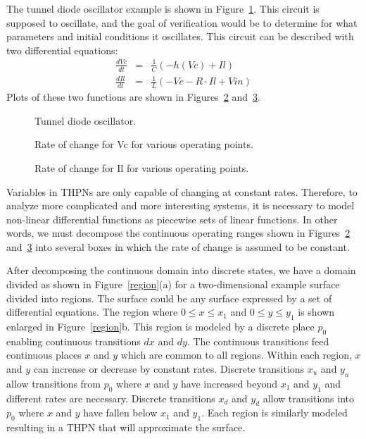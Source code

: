\documentclass[11pt,times]{article}
\begin{document}
The tunnel diode oscillator example is shown in Figure~\ref{tunnel}.
This circuit is supposed to oscillate, and the goal of verification would
be to determine for what parameters and initial conditions it oscillates.
This circuit can be described with two differential equations:
\begin{eqnarray*}
\frac{dVc}{dt} & = & \frac{1}{C}(-h(Vc) + Il) \\
\frac{dIl}{dt} & = & \frac{1}{L}(-Vc - R \cdot Il + Vin)
\end{eqnarray*}
Plots of these two functions are shown in Figures~\ref{dVc} and~\ref{dIl}.  

\begin{figure}[htbp]
\begin{center}
{\caption{\label{tunnel}Tunnel diode oscillator.}}
\end{center}
\end{figure}

\begin{figure}[htbp]
\begin{center}
{\caption{\label{dVc}Rate of change for Vc for various operating points.}}
\end{center}
\end{figure}

\begin{figure}[htbp]
\begin{center}
{\caption{\label{dIl}Rate of change for Il for various operating points.}}
\end{center}
\end{figure}

Variables in THPNs are only capable of changing at constant
rates.  Therefore, to analyze more complicated and more interesting
systems, it is necessary to model non-linear differential functions as
piecewise sets of linear functions.  In other words, we must decompose the 
continuous operating ranges shown in Figures~\ref{dVc} and~\ref{dIl} into
several boxes in which the rate of change is assumed to be constant.  

After decomposing the continuous domain into discrete states, we have a
domain divided as shown in Figure~\ref{region}(a) for a two-dimensional
example surface divided into regions.  The surface could be any surface
expressed by a set of differential equations.  The region where $0 \leq x \leq
x_1$ and $0 \leq y \leq y_1$ is shown enlarged in Figure~\ref{region}b.
This region is modeled by a discrete place
$p_0$ enabling continuous transitions $dx$ and $dy$.  The
continuous transitions feed continuous places $x$ and $y$ which are
common to all regions.  Within each region, $x$ and $y$ can increase
or decrease by  constant rates.  Discrete transitions $x_u$ and $y_u$
allow transitions from $p_0$  where $x$ and $y$ have increased beyond
$x_1$ and $y_1$ and different rates are necessary.  Discrete
transitions $x_d$ and $y_d$ allow transitions into $p_0$ where $x$ and
$y$ have fallen below $x_1$ and $y_1$.  Each region is similarly
modeled resulting in a THPN that will approximate the surface.  
\end{document}
